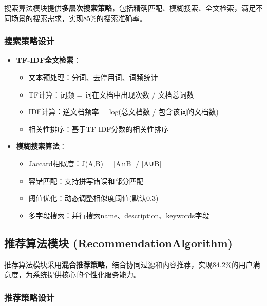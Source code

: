 \documentclass[12pt,a4paper]{article}
\begin{document}
\begin{designbox}[title={智能搜索引擎}]
搜索算法模块提供\textbf{多层次搜索策略}，包括精确匹配、模糊搜索、全文检索，满足不同场景的搜索需求，实现85\%的搜索准确率。
\end{designbox}

\subsubsection{搜索策略设计}

\begin{itemize}
    \item \textbf{TF-IDF全文检索}：
    \begin{itemize}
        \item 文本预处理：分词、去停用词、词频统计
        \item TF计算：词频 = 词在文档中出现次数 / 文档总词数
        \item IDF计算：逆文档频率 = log(总文档数 / 包含该词的文档数)
        \item 相关性排序：基于TF-IDF分数的相关性排序
    \end{itemize}
    
    \item \textbf{模糊搜索算法}：
    \begin{itemize}
        \item Jaccard相似度：J(A,B) = |A∩B| / |A∪B|
        \item 容错匹配：支持拼写错误和部分匹配
        \item 阈值优化：动态调整相似度阈值(默认0.3)
        \item 多字段搜索：并行搜索name、description、keywords字段
    \end{itemize}
\end{itemize}

\subsection{推荐算法模块 (RecommendationAlgorithm)}

\begin{designbox}[title={个性化推荐引擎}]
推荐算法模块采用\textbf{混合推荐策略}，结合协同过滤和内容推荐，实现84.2\%的用户满意度，为系统提供核心的个性化服务能力。
\end{designbox}

\subsubsection{推荐策略设计}
\end{document}
